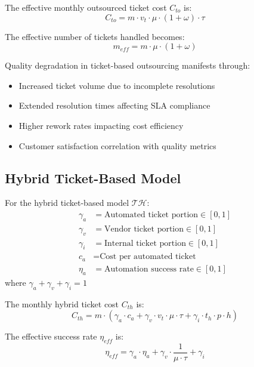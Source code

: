 \documentclass[12pt,a4paper]{article}
\newenvironment{definition}[1]
{\begin{mdframed}[style=definitionstyle,frametitle={Definition: #1}]}
{\end{mdframed}}
\newenvironment{observation}
{\begin{mdframed}[style=observationstyle,frametitle={Observation}]}
{\end{mdframed}}
\begin{document}
\begin{definition}{Outsourced Ticket Cost}
The effective monthly outsourced ticket cost $C_{to}$ is:
\begin{equation}
    C_{to} = m \cdot v_t \cdot \mu \cdot (1 + \omega) \cdot \tau
\end{equation}

The effective number of tickets handled becomes:
\begin{equation}
    m_{eff} = m \cdot \mu \cdot (1 + \omega)
\end{equation}
\end{definition}

\begin{observation}
Quality degradation in ticket-based outsourcing manifests through:
\begin{itemize}
    \item Increased ticket volume due to incomplete resolutions
    \item Extended resolution times affecting SLA compliance
    \item Higher rework rates impacting cost efficiency
    \item Customer satisfaction correlation with quality metrics
\end{itemize}
\end{observation}

\subsection{Hybrid Ticket-Based Model}
\begin{definition}{Hybrid Ticket Variables}
For the hybrid ticket-based model $\mathcal{TH}$:
\begin{align*}
    \gamma_a &= \text{Automated ticket portion} \in [0,1] \\
    \gamma_v &= \text{Vendor ticket portion} \in [0,1] \\
    \gamma_i &= \text{Internal ticket portion} \in [0,1] \\
    c_a &= \text{Cost per automated ticket} \\
    \eta_a &= \text{Automation success rate} \in [0,1]
\end{align*}
where $\gamma_a + \gamma_v + \gamma_i = 1$
\end{definition}

\begin{definition}{Hybrid Ticket Cost}
The monthly hybrid ticket cost $C_{th}$ is:
\begin{equation}
    C_{th} = m \cdot (\gamma_a \cdot c_a + \gamma_v \cdot v_t \cdot \mu \cdot \tau + \gamma_i \cdot t_h \cdot p \cdot h)
\end{equation}

The effective success rate $\eta_{eff}$ is:
\begin{equation}
    \eta_{eff} = \gamma_a \cdot \eta_a + \gamma_v \cdot \frac{1}{\mu \cdot \tau} + \gamma_i
\end{equation}
\end{definition}
\end{document}
